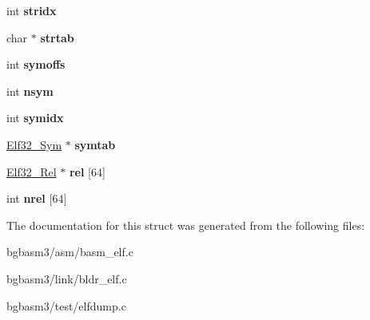 \begin{DoxyCompactItemize}
\item 
\hypertarget{structElf32__Context_a40db79d34ebb3241fa2369342c5225a3}{int {\bfseries stridx}}\label{structElf32__Context_a40db79d34ebb3241fa2369342c5225a3}

\item 
\hypertarget{structElf32__Context_ac322e3ea8c6642466be83b5c0aff2db8}{char $\ast$ {\bfseries strtab}}\label{structElf32__Context_ac322e3ea8c6642466be83b5c0aff2db8}

\item 
\hypertarget{structElf32__Context_a4f11ca5fe55b939e0a7fde3655bebeb3}{int {\bfseries symoffs}}\label{structElf32__Context_a4f11ca5fe55b939e0a7fde3655bebeb3}

\item 
\hypertarget{structElf32__Context_af21d746f4845c27be8519c83205675ed}{int {\bfseries nsym}}\label{structElf32__Context_af21d746f4845c27be8519c83205675ed}

\item 
\hypertarget{structElf32__Context_a32cc77180c7f89034703358e1bb97c77}{int {\bfseries symidx}}\label{structElf32__Context_a32cc77180c7f89034703358e1bb97c77}

\item 
\hypertarget{structElf32__Context_a70a2e858c287f067bfdea55e1532188f}{\hyperlink{structElf32__Sym}{Elf32\-\_\-\-Sym} $\ast$ {\bfseries symtab}}\label{structElf32__Context_a70a2e858c287f067bfdea55e1532188f}

\item 
\hypertarget{structElf32__Context_a64698dc61c7b8d8a0faf5333174ba750}{\hyperlink{structElf32__Rel}{Elf32\-\_\-\-Rel} $\ast$ {\bfseries rel} \mbox{[}64\mbox{]}}\label{structElf32__Context_a64698dc61c7b8d8a0faf5333174ba750}

\item 
\hypertarget{structElf32__Context_a7a1fa14154ceeab691ca41e960064818}{int {\bfseries nrel} \mbox{[}64\mbox{]}}\label{structElf32__Context_a7a1fa14154ceeab691ca41e960064818}

\end{DoxyCompactItemize}


The documentation for this struct was generated from the following files\-:\begin{DoxyCompactItemize}
\item 
bgbasm3/asm/basm\-\_\-elf.\-c\item 
bgbasm3/link/bldr\-\_\-elf.\-c\item 
bgbasm3/test/elfdump.\-c\end{DoxyCompactItemize}
